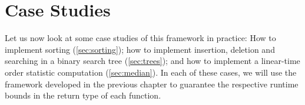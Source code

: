 
\chapter{Case Studies}
\label{ch:casestudiesdeterministic}
Let us now look at some case studies of this framework in practice: How to implement sorting (\autoref{sec:sorting}); how to implement insertion, deletion and searching in a binary search tree (\autoref{sec:trees}); and how to implement a linear-time order statistic computation (\autoref{sec:median}). In each of these cases, we will use the framework developed in the previous chapter to guarantee the respective runtime bounds in the return type of each function.



